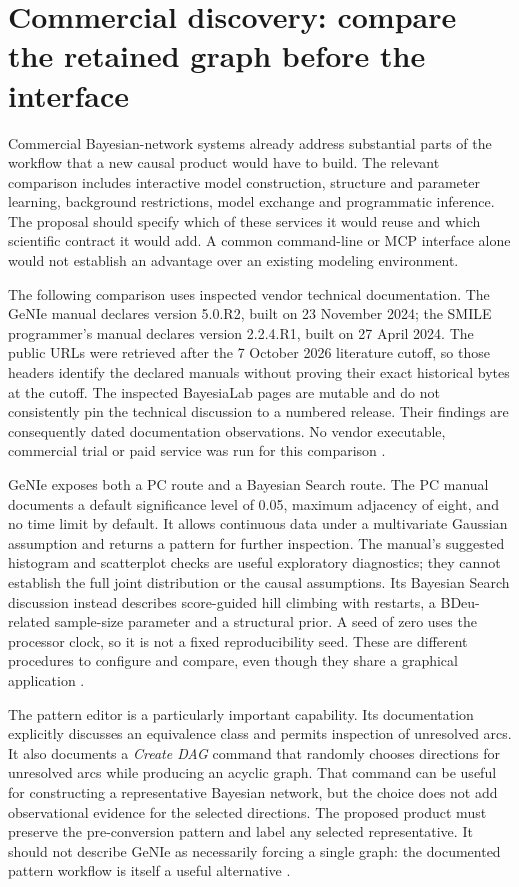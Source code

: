 \section{Commercial discovery: compare the retained graph before the interface}
\label{exec13:commercial}

Commercial Bayesian-network systems already address substantial parts of the
workflow that a new causal product would have to build. The relevant comparison
includes interactive model construction, structure and parameter learning,
background restrictions, model exchange and programmatic inference. The
proposal should specify which of these services it would reuse and which
scientific contract it would add. A common command-line or MCP interface
alone would not establish an advantage over an existing modeling environment.

The following comparison uses inspected vendor technical documentation.
The GeNIe manual declares version 5.0.R2, built on 23 November 2024; the
SMILE programmer's manual declares version 2.2.4.R1, built on 27 April 2024.
The public URLs were retrieved after the 7 October 2026 literature cutoff,
so those headers identify the declared manuals without proving their exact
historical bytes at the cutoff. The inspected BayesiaLab pages are mutable
and do not consistently pin the technical discussion to a numbered release.
Their findings are consequently dated documentation observations. No vendor
executable, commercial trial or paid service was run for this comparison
\citep{exec13_genie_readme,exec13_smile_intro,exec13_bayesia_structure}.

GeNIe exposes both a PC route and a Bayesian Search route. The PC manual
documents a default significance level of 0.05, maximum adjacency of eight,
and no time limit by default. It allows continuous data under a multivariate
Gaussian assumption and returns a pattern for further inspection. The
manual's suggested histogram and scatterplot checks are useful exploratory
diagnostics; they cannot establish the full joint distribution or the causal
assumptions. Its Bayesian Search discussion instead describes score-guided
hill climbing with restarts, a BDeu-related sample-size parameter and a
structural prior. A seed of zero uses the processor clock, so it is not a
fixed reproducibility seed. These are different procedures to configure
and compare, even though they share a graphical application
\citep{exec13_genie_pc,exec13_genie_bs}.

The pattern editor is a particularly important capability. Its documentation
explicitly discusses an equivalence class and permits inspection of unresolved
arcs. It also documents a \emph{Create DAG} command that randomly chooses
directions for unresolved arcs while producing an acyclic graph. That command
can be useful for constructing a representative Bayesian network, but the
choice does not add observational evidence for the selected directions.
The proposed product must preserve the pre-conversion pattern and label any
selected representative. It should not describe GeNIe as necessarily forcing
a single graph: the documented pattern workflow is itself a useful alternative
\citep{exec13_genie_pattern}.


